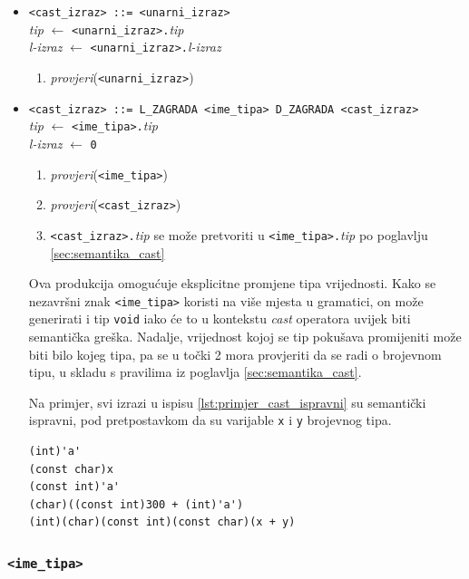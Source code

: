 \documentclass[times, 12pt, utf8]{book}
\begin{document}
\begin{itemize}

\item
\verb|<cast_izraz> ::= <unarni_izraz>|\\
\emph{tip} \(\leftarrow\) \verb|<unarni_izraz>.|\emph{tip}\\
\emph{l-izraz} \(\leftarrow\) \verb|<unarni_izraz>.|\emph{l-izraz}
\begin{enumerate}
\item
\emph{provjeri}(\verb|<unarni_izraz>|)
\end{enumerate}

\item
\verb|<cast_izraz> ::= L_ZAGRADA <ime_tipa> D_ZAGRADA <cast_izraz>|\\
\emph{tip} \(\leftarrow\) \verb|<ime_tipa>.|\emph{tip}\\
\emph{l-izraz} \(\leftarrow\) \verb|0|
\begin{enumerate}
\item
\emph{provjeri}(\verb|<ime_tipa>|)
\item
\emph{provjeri}(\verb|<cast_izraz>|)
\item
\verb|<cast_izraz>.|\emph{tip} se može pretvoriti u \verb|<ime_tipa>.|\emph{tip} po poglavlju \ref{sec:semantika_cast}
\end{enumerate}

Ova produkcija omogućuje eksplicitne promjene tipa vrijednosti.
Kako se nezavršni znak \verb|<ime_tipa>| koristi na više mjesta u gramatici, on može generirati i tip \verb|void| iako će to u kontekstu \emph{cast} operatora uvijek biti semantička greška.
Nadalje, vrijednost kojoj se tip pokušava promijeniti može biti bilo kojeg tipa, pa se u točki 2 mora provjeriti da se radi o brojevnom tipu, u skladu s pravilima iz poglavlja \ref{sec:semantika_cast}.

Na primjer, svi izrazi u ispisu \ref{lst:primjer_cast_ispravni} su semantički ispravni, pod pretpostavkom da su varijable \verb|x| i \verb|y| brojevnog tipa.

\begin{lstlisting}[caption={Ispravne primjene \emph{cast}-operatora.},label=lst:primjer_cast_ispravni]
(int)'a'
(const char)x
(const int)'a'
(char)((const int)300 + (int)'a')
(int)(char)(const int)(const char)(x + y)
\end{lstlisting}

\end{itemize}
 
\subsubsection{\texttt{<ime\_tipa>}}
\end{document}
